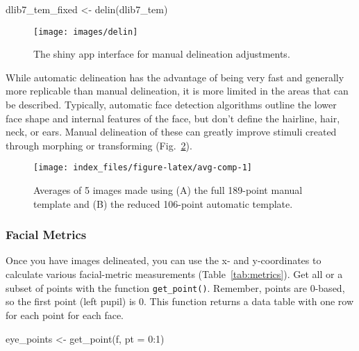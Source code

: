 \documentclass[
  doc,floatsintext]{apa6}
\newenvironment{Shaded}{\begin{snugshade}}{\end{snugshade}}
\newcommand{\AttributeTok}[1]{\textcolor[rgb]{0.77,0.63,0.00}{#1}}
\newcommand{\DecValTok}[1]{\textcolor[rgb]{0.00,0.00,0.81}{#1}}
\newcommand{\FunctionTok}[1]{\textcolor[rgb]{0.00,0.00,0.00}{#1}}
\newcommand{\NormalTok}[1]{#1}
\newcommand{\OtherTok}[1]{\textcolor[rgb]{0.56,0.35,0.01}{#1}}
\newcommand{\SpecialCharTok}[1]{\textcolor[rgb]{0.00,0.00,0.00}{#1}}
\begin{document}
\begin{Shaded}
\begin{Highlighting}[]
\NormalTok{dlib7\_tem\_fixed }\OtherTok{\textless{}{-}} \FunctionTok{delin}\NormalTok{(dlib7\_tem)}
\end{Highlighting}
\end{Shaded}

\begin{figure}
\texttt{[image: images/delin]} \caption{The shiny app interface for manual delineation adjustments.}\label{fig:delin-shiny}
\end{figure}

While automatic delineation has the advantage of being very fast and generally more replicable than manual delineation, it is more limited in the areas that can be described. Typically, automatic face detection algorithms outline the lower face shape and internal features of the face, but don't define the hairline, hair, neck, or ears. Manual delineation of these can greatly improve stimuli created through morphing or transforming (Fig.~\ref{fig:avg-comp}).

\begin{figure}
\texttt{[image: index\_files/figure-latex/avg-comp-1]} \caption{Averages of 5 images made using (A) the full 189-point manual template and (B) the reduced 106-point automatic template.}\label{fig:avg-comp}
\end{figure}

\hypertarget{facial-metrics}{%
\subsubsection{Facial Metrics}\label{facial-metrics}}

Once you have images delineated, you can use the x- and y-coordinates to calculate various facial-metric measurements (Table~\ref{tab:metrics}). Get all or a subset of points with the function \texttt{get\_point()}. Remember, points are 0-based, so the first point (left pupil) is 0. This function returns a data table with one row for each point for each face.

\begin{Shaded}
\begin{Highlighting}[]
\NormalTok{eye\_points }\OtherTok{\textless{}{-}} \FunctionTok{get\_point}\NormalTok{(f, }\AttributeTok{pt =} \DecValTok{0}\SpecialCharTok{:}\DecValTok{1}\NormalTok{)}
\end{Highlighting}
\end{Shaded}
\end{document}
